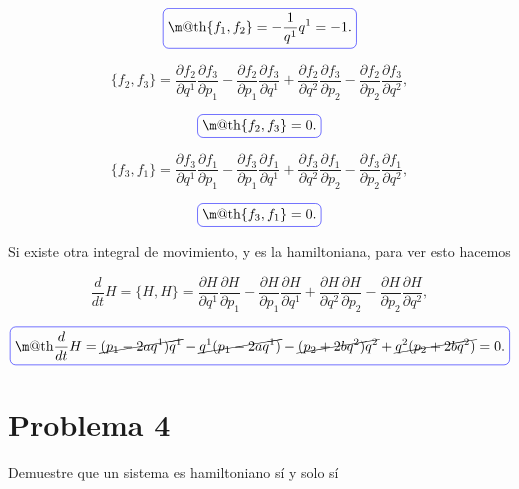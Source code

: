 \documentclass[a4paper,10pt]{article}
\makeatletter
\numberwithin{equation}{section}
\newcommand*{\boxcolor}{blue}
\renewcommand{\boxed}[1]{\textcolor{\boxcolor}{%
\tikz[baseline={([yshift=-1ex]current bounding box.center)}] \node [rectangle, minimum width=1ex,rounded corners,draw] {\normalcolor\m@th$\displaystyle#1$};}}
\makeatother
\begin{document}
\begin{equation}
 \boxed{ \{f_1,f_2\} = - \frac{1}{q^1}q^1 = -1. }
\end{equation}

\begin{equation}
 \{f_2,f_3\} = \frac{\partial f_2}{\partial q^1}\frac{\partial f_3}{\partial p_1} - 
 \frac{\partial f_2}{\partial p_1}\frac{\partial f_3}{\partial q^1} +  \frac{\partial f_2}{\partial q^2}\frac{\partial f_3}{\partial p_2} - 
 \frac{\partial f_2}{\partial p_2}\frac{\partial f_3}{\partial q^2},
\end{equation}

\begin{equation}
 \boxed{ \{f_2,f_3\} = 0 .}
\end{equation}

\begin{equation}
 \{f_3,f_1\} = \frac{\partial f_3}{\partial q^1}\frac{\partial f_1}{\partial p_1} - 
 \frac{\partial f_3}{\partial p_1}\frac{\partial f_1}{\partial q^1} +  \frac{\partial f_3}{\partial q^2}\frac{\partial f_1}{\partial p_2} - 
 \frac{\partial f_3}{\partial p_2}\frac{\partial f_1}{\partial q^2},
\end{equation}

\begin{equation}
 \boxed{ \{f_3,f_1\} = 0 .}
\end{equation}


Si existe otra integral de movimiento, y es la hamiltoniana, para ver esto hacemos 

\begin{equation}
 \frac{d}{dt} H = \{H,H\} = \frac{\partial H}{\partial q^1}\frac{\partial H}{\partial p_1} - 
 \frac{\partial H}{\partial p_1}\frac{\partial H}{\partial q^1} +  \frac{\partial H}{\partial q^2}\frac{\partial H}{\partial p_2} - 
 \frac{\partial H}{\partial p_2}\frac{\partial H}{\partial q^2},
\end{equation}

\begin{equation}
  \boxed{\frac{d}{dt} H = \cancel{(p_1 - 2aq^1)q^1} - \cancel{q^1(p_1 - 2aq^1)} - \cancel{(p_2 + 2bq^2)q^2} + 
  \cancel{q^2(p_2 + 2bq^2)} = 0.}
\end{equation}



\section{Problema 4}

Demuestre que un sistema es hamiltoniano sí y solo sí
\end{document}
